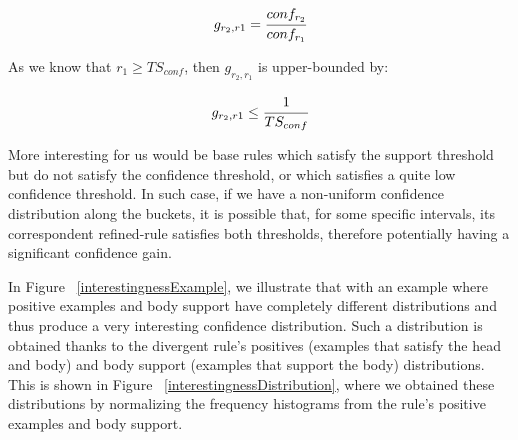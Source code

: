 \begin{equation}
 g_{r_2,r1}=\cfrac{conf_{r_2}}{conf_{r_1}}
\end{equation}

As we know that $r_1 \geq TS_{conf}$, then $g_{r_2,r_1}$ is upper-bounded by:

\begin{equation}
 g_{r_2,r1} \leq \cfrac{1}{TS_{conf}}
\end{equation}

More interesting for us would be base rules which satisfy the support threshold but do not satisfy the confidence
threshold, or which satisfies a quite low confidence threshold. In such case, if we have a non-uniform confidence
distribution along the buckets, it is possible that, for some specific intervals, its correspondent refined-rule
satisfies both thresholds, therefore potentially having a significant confidence gain.

In Figure ~\ref{interestingnessExample}, we illustrate that with an example where positive examples and body
support have completely different distributions and thus produce a very interesting confidence distribution. Such a
distribution is obtained thanks to the divergent rule's positives (examples that satisfy the head and body) and body
support (examples that support the body) distributions. This is shown in Figure ~\ref{interestingnessDistribution},
where we obtained these distributions by normalizing the frequency histograms
from the rule's positive examples and body support.

